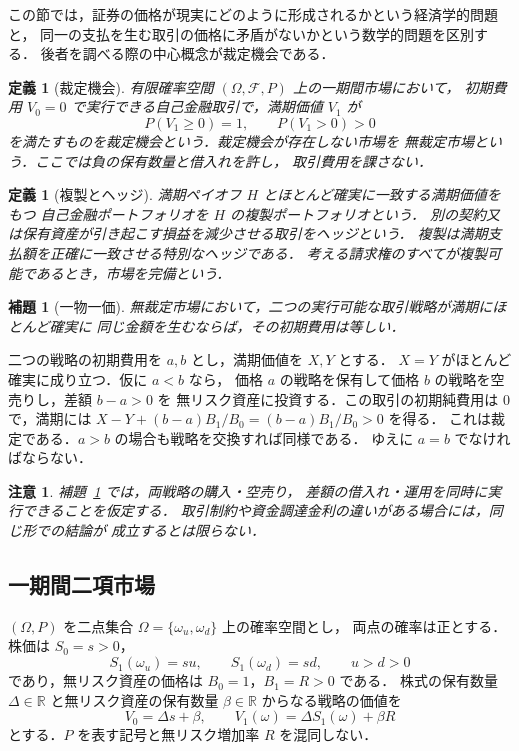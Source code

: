 \documentclass[a5paper,10pt,onecolumn]{jsarticle}
\makeatletter
\theoremstyle{mathnotetheorem}
\newtheorem{definition}[theorem]{定義}
\newtheorem{lemma}[theorem]{補題}
\newtheorem{remark}[theorem]{注意}
\renewcommand{\proofname}{証明}
\renewenvironment{proof}[1][\proofname]{%
  \par\pushQED{\qed}\normalfont\topsep4\p@\@plus2\p@\relax
  \trivlist\item[\hskip\labelsep\bfseries #1]\ignorespaces
}{\popQED\endtrivlist\@endpefalse}
\newcommand{\R}{\mathbb{R}}
\makeatother
\begin{document}
この節では，証券の価格が現実にどのように形成されるかという経済学的問題と，
同一の支払を生む取引の価格に矛盾がないかという数学的問題を区別する．
後者を調べる際の中心概念が裁定機会である．

\begin{definition}[裁定機会]
有限確率空間 $(\Omega,\mathcal F,P)$ 上の一期間市場において，
初期費用 $V_0=0$ で実行できる自己金融取引で，満期価値 $V_1$ が
\[
 P(V_1\ge0)=1,\qquad P(V_1>0)>0
\]
を満たすものを\emph{裁定機会}という．裁定機会が存在しない市場を
\emph{無裁定市場}という．ここでは負の保有数量と借入れを許し，
取引費用を課さない．
\end{definition}

\begin{definition}[複製とヘッジ]
満期ペイオフ $H$ とほとんど確実に一致する満期価値をもつ
自己金融ポートフォリオを $H$ の\emph{複製ポートフォリオ}という．
別の契約又は保有資産が引き起こす損益を減少させる取引を\emph{ヘッジ}という．
複製は満期支払額を正確に一致させる特別なヘッジである．
考える請求権のすべてが複製可能であるとき，市場を\emph{完備}という．
\end{definition}

\begin{lemma}[一物一価]\label{lem:oneprice}
無裁定市場において，二つの実行可能な取引戦略が満期にほとんど確実に
同じ金額を生むならば，その初期費用は等しい．
\end{lemma}
\begin{proof}
二つの戦略の初期費用を $a,b$ とし，満期価値を $X,Y$ とする．
$X=Y$ がほとんど確実に成り立つ．仮に $a<b$ なら，
価格 $a$ の戦略を保有して価格 $b$ の戦略を空売りし，差額 $b-a>0$ を
無リスク資産に投資する．この取引の初期純費用は $0$ で，満期には
$X-Y+(b-a)B_1/B_0=(b-a)B_1/B_0>0$ を得る．
これは裁定である．$a>b$ の場合も戦略を交換すれば同様である．
ゆえに $a=b$ でなければならない．\end{proof}

\begin{remark}
補題~\ref{lem:oneprice} では，両戦略の購入・空売り，
差額の借入れ・運用を同時に実行できることを仮定する．
取引制約や資金調達金利の違いがある場合には，同じ形での結論が
成立するとは限らない．
\end{remark}

\subsection{一期間二項市場}

$(\Omega,P)$ を二点集合 $\Omega=\{\omega_u,\omega_d\}$ 上の確率空間とし，
両点の確率は正とする．株価は $S_0=s>0$，
\[
 S_1(\omega_u)=su,\qquad S_1(\omega_d)=sd,
 \qquad u>d>0
\]
であり，無リスク資産の価格は $B_0=1$，$B_1=R>0$ である．
株式の保有数量 $\Delta\in\R$ と無リスク資産の保有数量
$\beta\in\R$ からなる戦略の価値を
\[
 V_0=\Delta s+\beta,\qquad
 V_1(\omega)=\Delta S_1(\omega)+\beta R
\]
とする．$P$ を表す記号と無リスク増加率 $R$ を混同しない．
\end{document}
